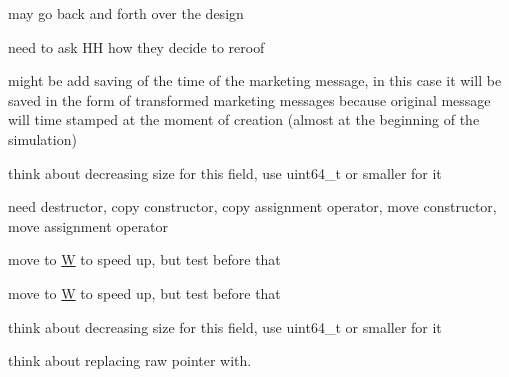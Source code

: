 \begin{DoxyRefList}
\item[\label{_dev_stage2__DevStage2000006}%
\hypertarget{_dev_stage2__DevStage2000006}{}%
Member \hyperlink{classsolar__core_1_1_household_aaa1f1e52009d8aef32d3c5a9367b93b7}{solar\+\_\+core\+:\+:Household\+:\+:dec\+\_\+evaluate\+\_\+designs} ()]may go back and forth over the design 
\item[\label{_dev_stage2__DevStage2000010}%
\hypertarget{_dev_stage2__DevStage2000010}{}%
Member \hyperlink{classsolar__core_1_1_household_aa63241ca3fcc1f2374d10b5c7f44124a}{solar\+\_\+core\+:\+:Household\+:\+:dec\+\_\+project\+\_\+reroof} (std\+::shared\+\_\+ptr$<$ P\+V\+Project $>$ project)]need to ask H\+H how they decide to reroof  
\item[\label{_dev_stage2__DevStage2000004}%
\hypertarget{_dev_stage2__DevStage2000004}{}%
Member \hyperlink{classsolar__core_1_1_household_ac9d26af7b52f0cdc357fc5dca4b86ad9}{solar\+\_\+core\+:\+:Household\+:\+:get\+\_\+inf} (std\+::shared\+\_\+ptr$<$ Mes\+Marketing\+S\+E\+I $>$ mes\+\_\+) override]might be add saving of the time of the marketing message, in this case it will be saved in the form of transformed marketing messages because original message will time stamped at the moment of creation (almost at the beginning of the simulation)  
\item[\label{_dev_stage2__DevStage2000012}%
\hypertarget{_dev_stage2__DevStage2000012}{}%
Member \hyperlink{classsolar__core_1_1_household_a1104d8264fe733937e1fd2e9ad0f8fc1}{solar\+\_\+core\+:\+:Household\+:\+:house} ]think about decreasing size for this field, use uint64\+\_\+t or smaller for it  
\item[\label{_dev_stage2__DevStage2000009}%
\hypertarget{_dev_stage2__DevStage2000009}{}%
Member \hyperlink{classsolar__core_1_1_household_a5f84bf614d0ec70abf9597ec97e07b1a}{solar\+\_\+core\+:\+:Household\+:\+:Household} (Property\+Tree \&pt\+\_\+, \hyperlink{classsolar__core_1_1_w}{W} $\ast$w\+\_\+)]need destructor, copy constructor, copy assignment operator, move constructor, move assignment operator

move to \hyperlink{classsolar__core_1_1_w}{W} to speed up, but test before that 

move to \hyperlink{classsolar__core_1_1_w}{W} to speed up, but test before that  
\item[\label{_dev_stage2__DevStage2000011}%
\hypertarget{_dev_stage2__DevStage2000011}{}%
Member \hyperlink{classsolar__core_1_1_household_a1ba6b7af82982096e05d99a70a2647eb}{solar\+\_\+core\+:\+:Household\+:\+:location\+\_\+y} ]think about decreasing size for this field, use uint64\+\_\+t or smaller for it  
\item[\label{_dev_stage2__DevStage2000013}%
\hypertarget{_dev_stage2__DevStage2000013}{}%
Member \hyperlink{classsolar__core_1_1_household_a297842358a2d79db160566106972bc0d}{solar\+\_\+core\+:\+:Household\+:\+:preliminary\+\_\+quotes} ]think about replacing raw pointer with. 


\end{DoxyRefList}
